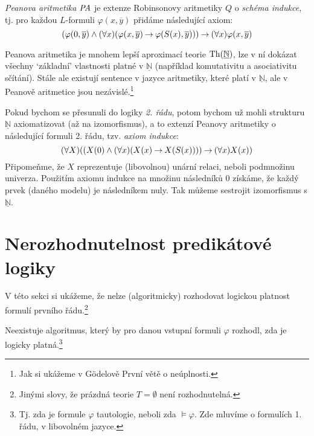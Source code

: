 \begin{definition}
\emph{Peanova aritmetika} $\text{\it PA}$ je extenze Robinsonovy  aritmetiky $Q$ o \emph{schéma indukce}, tj. pro každou $L$-formuli $\varphi(x,\overline{y})$ přidáme následující axiom:
$$
(\varphi(0,\overline{y}) \land (\forall x)(\varphi(x,\overline{y})\mathbin{\rightarrow} \varphi(S(x),\overline{y}))) \mathbin{\rightarrow} (\forall x)\varphi(x,\overline{y})
$$
\end{definition}

Peanova aritmetika je mnohem lepší aproximací teorie $\operatorname{Th}(\underline{\mathbb N})$, lze v ní dokázat všechny `základní' vlastnosti platné v $\underline{\mathbb N}$ (například komutativitu a asociativitu sčítání). Stále ale existují sentence v jazyce aritmetiky, které platí v $\underline{\mathbb N}$, ale v Peanově aritmetice jsou nezávislé.\footnote{Jak si ukážeme v Gödelově První větě o neúplnosti.} 

\begin{remark}
Pokud bychom se přesunuli do logiky \emph{2. řádu}, potom bychom už mohli strukturu $\underline{\mathbb N}$ axiomatizovat (až na izomorfismus), a to extenzí Peanovy aritmetiky o následující formuli 2. řádu, tzv. \emph{axiom indukce}:
$$
(\forall X)((X(0) \land (\forall x)(X(x) \mathbin{\rightarrow} X(S(x)))) \mathbin{\rightarrow} (\forall x)X(x))
$$
Připomeňme, že $X$ reprezentuje (libovolnou) unární relaci, neboli podmnožinu univerza. Použitím axiomu indukce na množinu následníků 0 získáme, že každý prvek (daného modelu) je následníkem nuly. Tak můžeme sestrojit izomorfismus s $\underline{\mathbb N}$.
\end{remark}

\section{Nerozhodnutelnost predikátové logiky}
    
V této sekci si ukážeme, že nelze (algoritmicky) rozhodovat logickou platnost formulí prvního řádu.\footnote{Jinými slovy, že prázdná teorie $T=\emptyset$ není rozhodnutelná.}

\begin{theorem}\label{theorem:undecidability-of-predicate-logic}
Neexistuje algoritmus, který by pro danou vstupní formuli $\varphi$ rozhodl, zda je logicky platná.\footnote{Tj. zda je formule $\varphi$ tautologie, neboli zda $\models\varphi$. Zde mluvíme o formulích 1. řádu, v libovolném jazyce.}
\end{theorem}

